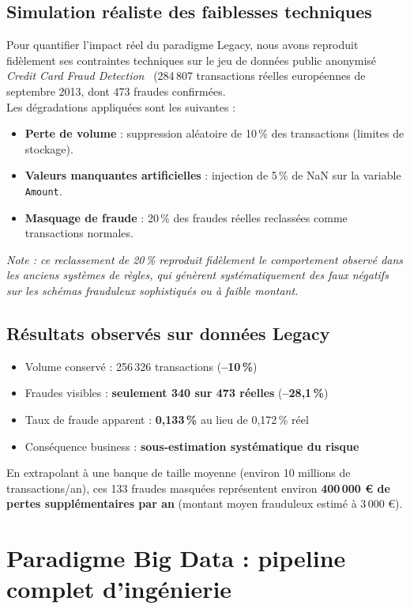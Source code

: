 \subsection{Simulation réaliste des faiblesses techniques}
Pour quantifier l’impact réel du paradigme Legacy, nous avons reproduit fidèlement ses contraintes techniques sur le jeu de données public anonymisé \textit{Credit Card Fraud Detection}~\parencite{creditcardfraud} (284\,807 transactions réelles européennes de septembre 2013, dont 473 fraudes confirmées.\\

Les dégradations appliquées sont les suivantes :
\begin{itemize}
    \item \textbf{Perte de volume} : suppression aléatoire de 10\,\% des transactions (limites de stockage).
    \item \textbf{Valeurs manquantes artificielles} : injection de 5\,\% de NaN sur la variable \texttt{Amount}.
    \item \textbf{Masquage de fraude} : 20\,\% des fraudes réelles reclassées comme transactions normales.
\end{itemize}
\textit{Note : ce reclassement de 20\,\% reproduit fidèlement le comportement observé dans les anciens systèmes de règles, qui génèrent systématiquement des faux négatifs sur les schémas frauduleux sophistiqués ou à faible montant.}
\clearpage
\subsection{Résultats observés sur données Legacy}
\begin{itemize}
    \item Volume conservé : 256\,326 transactions (\textbf{–10\,\%})
    \item Fraudes visibles : \textbf{seulement 340 sur 473 réelles} (\textbf{–28,1\,\%})
    \item Taux de fraude apparent : \textbf{0,133\,\%} au lieu de 0,172\,\% réel
    \item Conséquence business : \textbf{sous-estimation systématique du risque}
\end{itemize}
En extrapolant à une banque de taille moyenne (environ 10 millions de transactions/an), ces 133 fraudes masquées représentent environ \textbf{400\,000 € de pertes supplémentaires par an} (montant moyen frauduleux estimé à 3\,000 €).

\section{Paradigme Big Data : pipeline complet d’ingénierie}

